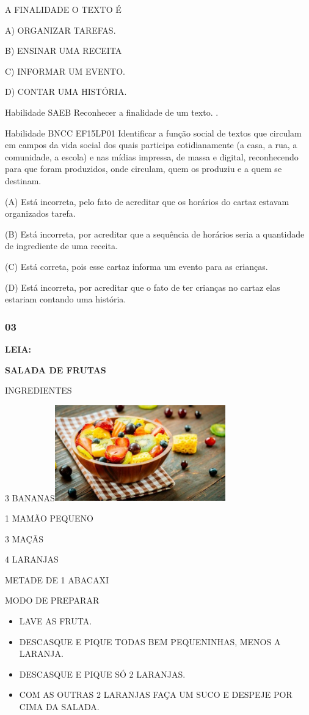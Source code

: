 \begin{escola}
A FINALIDADE O TEXTO É

A) ORGANIZAR TAREFAS.

B) ENSINAR UMA RECEITA

C) INFORMAR UM EVENTO.

D) CONTAR UMA HISTÓRIA.

Habilidade SAEB Reconhecer a finalidade de um texto. .

Habilidade BNCC EF15LP01 Identificar a função social de textos que
circulam em campos da vida social dos quais participa cotidianamente (a
casa, a rua, a comunidade, a escola) e nas mídias impressa, de massa e
digital, reconhecendo para que foram produzidos, onde circulam, quem os
produziu e a quem se destinam.

(A) Está incorreta, pelo fato de acreditar que os horários do cartaz
estavam organizados tarefa.

(B) Está incorreta, por acreditar que a sequência de horários seria a
quantidade de ingrediente de uma receita.

(C) Está correta, pois esse cartaz informa um evento para as crianças.

(D) Está incorreta, por acreditar que o fato de ter crianças no cartaz
elas estariam contando uma história.

\subsubsection{03 }\label{section-14}

\textbf{LEIA:}

\textbf{SALADA DE FRUTAS}

INGREDIENTES

3
BANANAS\includegraphics[width=2.90350in,height=1.63264in]{media/image159.jpg}

1 MAMÃO PEQUENO

3 MAÇÃS

4 LARANJAS

METADE DE 1 ABACAXI

MODO DE PREPARAR

\begin{itemize}
\item
  LAVE AS FRUTA.
\item
  DESCASQUE E PIQUE TODAS BEM PEQUENINHAS, MENOS A LARANJA.
\item
  DESCASQUE E PIQUE SÓ 2 LARANJAS.
\item
  COM AS OUTRAS 2 LARANJAS FAÇA UM SUCO E DESPEJE POR CIMA DA SALADA.
\end{itemize}


\end{escola}

